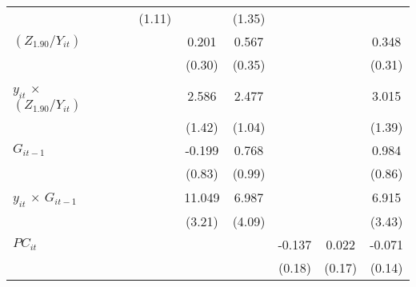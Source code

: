 \documentclass[12pt, a4paper]{article}
\begin{document}
\begin{table}[htbp]
\begin{threeparttable}
{\begin{tabular}{l*{9}{c}}
				&                     &                     &                     &      (1.11)         &                     &      (1.35)         &                     &                     &                     \\
				$(Z_{1.90}/Y_{it})$          &                     &                     &                     &                     &       0.201         &       0.567         &                     &                     &       0.348         \\
				&                     &                     &                     &                     &      (0.30)         &      (0.35)         &                     &                     &      (0.31)         \\
				$y_{it}$ $\times$ $(Z_{1.90}/Y_{it})$&                     &                     &                     &                     &       2.586         &       2.477\sym{*}  &                     &                     &       3.015\sym{*}  \\
				&                     &                     &                     &                     &      (1.42)         &      (1.04)         &                     &                     &      (1.39)         \\
				$G_{it-1}$            &                     &                     &                     &                     &      -0.199         &       0.768         &                     &                     &       0.984         \\
				&                     &                     &                     &                     &      (0.83)         &      (0.99)         &                     &                     &      (0.86)         \\
				$y_{it}$ $\times$ $G_{it-1}$&                     &                     &                     &                     &      11.049\sym{**} &       6.987         &                     &                     &       6.915\sym{*}  \\
				&                     &                     &                     &                     &      (3.21)         &      (4.09)         &                     &                     &      (3.43)         \\
				$PC_{it}$               &                     &                     &                     &                     &                     &                     &      -0.137         &       0.022         &      -0.071         \\
				&                     &                     &                     &                     &                     &                     &      (0.18)         &      (0.17)         &      (0.14)         \\

\end{tabular}}
\end{threeparttable}
\end{table}
\end{document}
